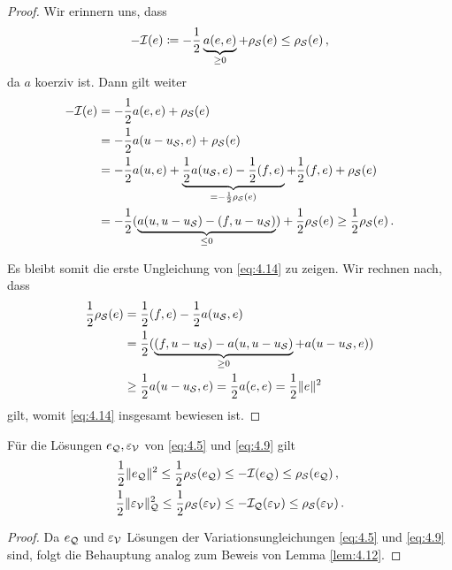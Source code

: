 \begin{proof}
Wir erinnern uns, dass
\[
	-\mathcal I (e) \coloneqq - \frac 12 \underbrace{a(e,e)}_{\ge 0} + \rho_{\mathcal S} (e) \le \rho_{\mathcal S}(e) \, , 
\]
da $a$ koerziv ist. Dann gilt weiter
\begin{align*}
	-\mathcal I(e) & = - \frac 12 a(e,e) + \rho_{\mathcal S} (e) \\
	& = -\frac 1 2 a(u-u_{\mathcal S},e) + \rho_{\mathcal S} (e) \\
	& = -\frac 1 2 a(u,e) +\underbrace{\frac 1 2 a(u_{\mathcal S},e)-\frac 1 2(f,e)}_{=-\frac 12 \rho_{\mathcal S}(e)} + \frac 1 2 (f,e)+\rho_{\mathcal S}(e) \\
	& = -\frac 12 (\underbrace{a(u,u-u_{\mathcal S})-(f,u-u_{\mathcal S})}_{\le 0}) + \frac 1 2\rho_{\mathcal S}(e) \ge \frac 1 2\rho_{\mathcal S}(e) \, .
\end{align*}

Es bleibt somit die erste Ungleichung von \eqref{eq:4.14} zu zeigen. Wir rechnen nach, dass
\begin{align*}
	\frac 1 2 \rho_{\mathcal S} (e) &= \frac 1 2 (f,e)-\frac 1 2a(u_{\mathcal S},e) \\
	& = \frac 1 2 (\underbrace{(f,u-u_{\mathcal S}) - a(u,u-u_{\mathcal S})}_{\ge 0} + a(u-u_{\mathcal S},e)) \\
	& \ge \frac 1 2 a(u-u_{\mathcal S},e) =\frac 1 2 a(e,e) =  \frac 1 2 \lVert e\rVert^2 
\end{align*}
gilt, womit \eqref{eq:4.14} insgesamt bewiesen ist.
\end{proof}


\begin{kor}\label{kor:4.13}
Für die Lösungen $e_{\mathcal Q}, \varepsilon_{\mathcal V}$ von \eqref{eq:4.5} und \eqref{eq:4.9} gilt
\begin{align}\label{eq:4.15}
	\frac 12 \lVert e_{\mathcal Q}\rVert^2 \le \frac 12 \rho_{\mathcal S}(e_{\mathcal Q})& \le -\mathcal I (e_{\mathcal Q}) \le \rho_{\mathcal S}(e_{\mathcal Q}) \, ,\\
	\label{eq:4.16}
	\frac 12 \lVert \varepsilon_{\mathcal V}\rVert_{\mathcal Q}^2 \le \frac 12 \rho_{\mathcal S}(\varepsilon_{\mathcal V})& \le -\mathcal I_{\mathcal Q} (\varepsilon_{\mathcal V}) \le \rho_{\mathcal S}(\varepsilon_{\mathcal V})\, .
\end{align}
\end{kor}

\begin{proof}
Da $e_{\mathcal Q}$ und $\varepsilon_{\mathcal V}$ Lösungen der Variationsungleichungen \eqref{eq:4.5} und \eqref{eq:4.9} sind, folgt die Behauptung analog zum Beweis von Lemma \ref{lem:4.12}.
\end{proof}


